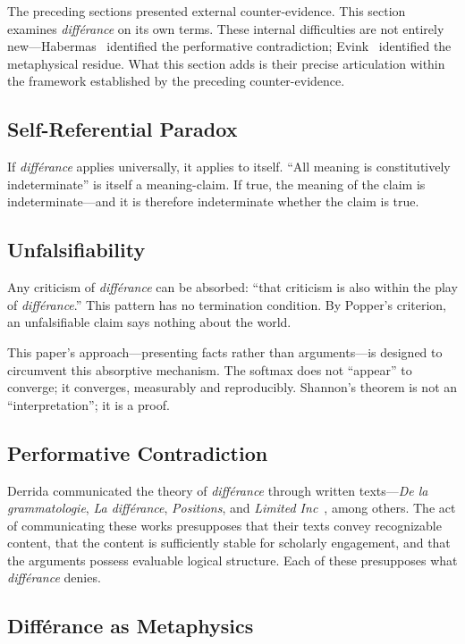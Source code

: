 \documentclass[a4paper,twocolumn,11pt]{article}
\begin{document}
The preceding sections presented external counter-evidence. This section examines \emph{diff\'erance} on its own terms. These internal difficulties are not entirely new---Habermas~\cite{Habermas1985} identified the performative contradiction; Evink~\cite{Evink2020} identified the metaphysical residue. What this section adds is their precise articulation within the framework established by the preceding counter-evidence.

\subsection{Self-Referential Paradox}

If \emph{diff\'erance} applies universally, it applies to itself. ``All meaning is constitutively indeterminate'' is itself a meaning-claim. If true, the meaning of the claim is indeterminate---and it is therefore indeterminate whether the claim is true.

\subsection{Unfalsifiability}

Any criticism of \emph{diff\'erance} can be absorbed: ``that criticism is also within the play of \emph{diff\'erance}.'' This pattern has no termination condition. By Popper's criterion, an unfalsifiable claim says nothing about the world.

This paper's approach---presenting facts rather than arguments---is designed to circumvent this absorptive mechanism. The softmax does not ``appear'' to converge; it converges, measurably and reproducibly. Shannon's theorem is not an ``interpretation''; it is a proof.

\subsection{Performative Contradiction}

Derrida communicated the theory of \emph{diff\'erance} through written texts---\emph{De la grammatologie}, \emph{La diff\'erance}, \emph{Positions}, and \emph{Limited Inc}~\cite{Derrida1988}, among others. The act of communicating these works presupposes that their texts convey recognizable content, that the content is sufficiently stable for scholarly engagement, and that the arguments possess evaluable logical structure. Each of these presupposes what \emph{diff\'erance} denies.

\subsection{Diff\'erance as Metaphysics}
\end{document}
